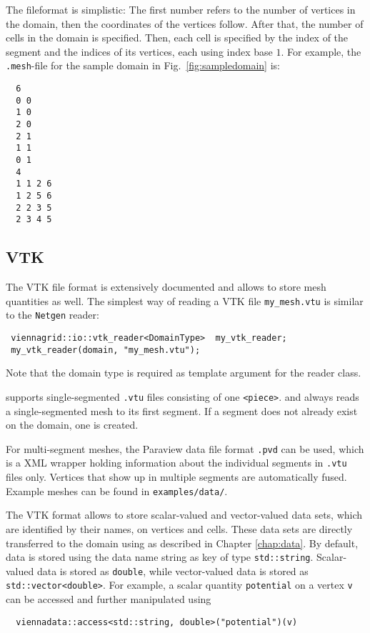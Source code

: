  The fileformat is simplistic: The first number refers to the number of vertices in the domain, then the coordinates of the vertices follow. After that, the number of cells in the domain is specified. Then, each cell is specified by the index of the segment and the indices of its vertices, each using index base $1$.
 For example, the \texttt{.mesh}-file for the sample domain in Fig.~\ref{fig:sampledomain} is:
 \begin{verbatim}
  6
  0 0
  1 0
  2 0
  2 1
  1 1
  0 1
  4
  1 1 2 6
  1 2 5 6
  2 2 3 5
  2 3 4 5
 \end{verbatim}

 \subsection{VTK}
 The VTK file format is extensively documented \cite{VTKfileformat} and allows to store mesh quantities as well.
 The simplest way of reading a VTK file \lstinline|my_mesh.vtu| is similar to the \texttt{Netgen} reader:
 \begin{lstlisting}
 viennagrid::io::vtk_reader<DomainType>  my_vtk_reader;
 my_vtk_reader(domain, "my_mesh.vtu");
 \end{lstlisting}
 Note that the domain type is required as template argument for the reader class.

 {\ViennaGrid} supports single-segmented \lstinline|.vtu| files consisting of one \lstinline|<piece>|.
 and always reads a single-segmented mesh to its first segment. If a segment does not already exist on the domain, one is created.

 For multi-segment meshes, the Paraview \cite{paraview} data file format \lstinline|.pvd| can be used, which is a XML wrapper holding information about the individual segments in \lstinline|.vtu| files only. Vertices that show up in multiple segments are automatically fused. Example meshes can be found in \texttt{examples/data/}.


 The VTK format allows to store scalar-valued and vector-valued data sets, which are identified by their names, on vertices and cells.
 These data sets are directly transferred to the {\ViennaGrid} domain using {\ViennaData} as described in Chapter \ref{chap:data}.
 By default, data is stored using the data name string as key of type \lstinline|std::string|.
 Scalar-valued data is stored as \lstinline|double|, while vector-valued data is stored as \lstinline|std::vector<double>|.
 For example, a scalar quantity \texttt{potential} on a vertex \lstinline|v| can be accessed and further manipulated using
 \begin{lstlisting}
  viennadata::access<std::string, double>("potential")(v)
 \end{lstlisting}

